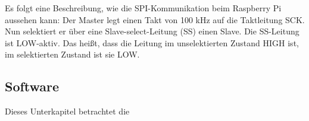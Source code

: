 Es folgt eine Beschreibung, wie die \ac{SPI}-Kommunikation beim Raspberry Pi aussehen kann: Der Master legt einen Takt von 100 kHz auf die Taktleitung SCK. Nun selektiert er über eine Slave-select-Leitung (SS) einen Slave. Die SS-Leitung ist LOW-aktiv. Das heißt, dass die Leitung im unselektierten Zustand HIGH ist, im selektierten Zustand ist sie LOW. 

 




 
\subsection{Software}
Dieses Unterkapitel betrachtet die 
 





          
 
